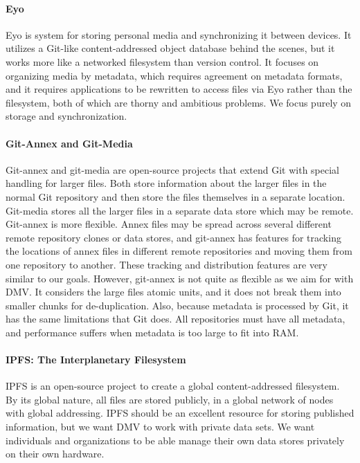 \paragraph{Eyo}

Eyo \cite{Strauss:2011:EDP:2002181.2002216} is system for storing personal media
and synchronizing it between devices. It utilizes a Git-like content-addressed
object database behind the scenes, but it works more like a networked filesystem
than version control. It focuses on organizing media by metadata, which requires
agreement on metadata formats, and it requires applications to be rewritten to
access files via Eyo rather than the filesystem, both of which are thorny and
ambitious problems. We focus purely on storage and synchronization.


\paragraph{Git-Annex and Git-Media}

Git-annex \cite{git_annex_homepage} and git-media \cite{git_media_github} are
open-source projects that extend Git with special handling for larger files.
Both store information about the larger files in the normal Git repository and
then store the files themselves in a separate location. Git-media stores all the
larger files in a separate data store which may be remote. Git-annex is more
flexible. Annex files may be spread across several different remote repository
clones or data stores, and git-annex has features for tracking the locations of
annex files in different remote repositories and moving them from one repository
to another. These tracking and distribution features are very similar to our
goals. However, git-annex is not quite as flexible as we aim for with DMV. It
considers the large files atomic units, and it does not break them into smaller
chunks for de-duplication. Also, because metadata is processed by Git, it has
the same limitations that Git does. All repositories must have all metadata, and
performance suffers when metadata is too large to fit into RAM.


\paragraph{IPFS: The Interplanetary Filesystem}

IPFS \cite{ipfs_github_main} is an open-source project to create a global
content-addressed filesystem. By its global nature, all files are stored
publicly, in a global network of nodes with global addressing. IPFS should be an
excellent resource for storing published information, but we want DMV to work
with private data sets. We want individuals and organizations to be able manage
their own data stores privately on their own hardware.

